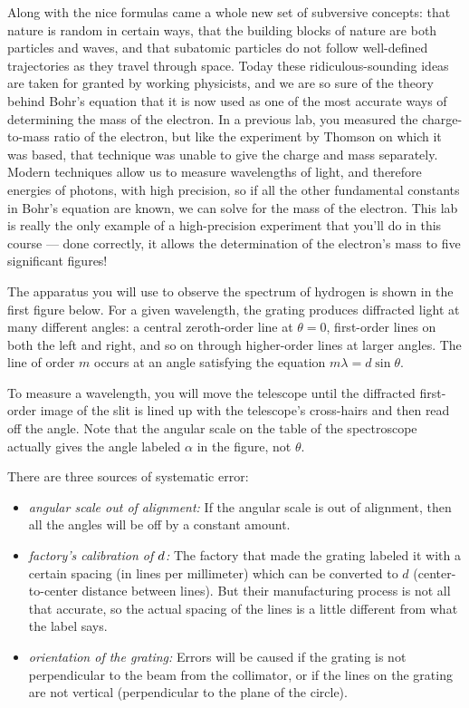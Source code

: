 Along with the nice formulas came a whole new set of
subversive concepts: that nature is random in certain ways,
that the building blocks of nature are both particles and
waves, and that subatomic particles do not follow well-defined
trajectories as they travel through space. Today these
ridiculous-sounding ideas are taken for granted by working
physicists, and we are so sure of the theory behind Bohr's
equation that it is now used as one of the most accurate
ways of determining the mass of the electron. In a previous
lab, you measured the charge-to-mass ratio of the electron,
but like the experiment by Thomson on which it was based,
that technique was unable to give the charge and mass
separately. Modern techniques allow us to measure wavelengths
of light, and therefore energies of photons, with high
precision, so if all the other fundamental constants in
Bohr's equation are known, we can solve for the mass of the
electron. This lab is really the only example of a
high-precision experiment that you'll do in this course ---
done correctly, it allows the determination of the
electron's mass to five significant figures!


The apparatus you will use to observe the spectrum of
hydrogen is shown in the first figure below. For a given wavelength, the
grating produces diffracted light at many different angles:
a central zeroth-order line at $\theta=0$, first-order lines on
both the left and right, and so on through higher-order
lines at larger angles.  The line of order $m$ occurs at an
angle satisfying the equation $m\lambda=d\sin\theta$.

To measure a wavelength, you will move the telescope until
the diffracted first-order image of the slit is lined up
with the telescope's cross-hairs and then read off the
angle. Note that the angular scale on the table of the
spectroscope actually gives the angle labeled $\alpha$ in
the figure, not $\theta$.


There are three sources of systematic error:

\begin{itemize}
\item[] \emph{angular scale out of alignment:\/} If the angular scale is out
of alignment, then all the angles will be off by a constant amount.

\item[] \emph{factory's calibration of $d\/$:\/} The factory that made the
grating labeled it with a certain spacing (in lines per
millimeter) which can be converted to $d$ (center-to-center
distance between lines). But their manufacturing process is
not all that accurate, so the actual spacing of the lines is
a little different from what the label says.

\item[] \emph{orientation of the grating:\/} Errors will be caused if the grating
is not perpendicular to the beam from the collimator, or if the lines on the
grating are not vertical (perpendicular to the plane of the circle).
\end{itemize}

